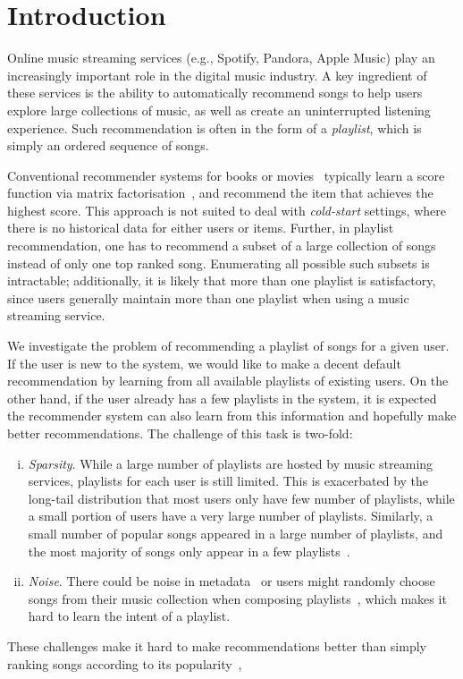 
\section{Introduction}
\label{sec:intro}
Online music streaming services (e.g., Spotify, Pandora, Apple Music) %
play an increasingly important role in the digital music industry.
A key ingredient of these services is the ability to automatically recommend songs to help users explore large collections of music,
as well as create an uninterrupted listening experience.
Such recommendation is often in the form of a \emph{playlist}, which is simply an ordered sequence of songs.

Conventional recommender systems for books or movies~\citep{Sarwar:2001,Netflix}
typically learn a score function via matrix factorisation~\citep{Koren:2009},
and recommend the item that achieves the highest score.
This approach is not suited to deal with \emph{cold-start} settings,
where there is no historical data for either users or items.
%
Further, in playlist recommendation,
one has to recommend a subset of a large collection of songs instead of only one top ranked song.
Enumerating all possible such subsets is intractable;
additionally,
it is likely that more than one playlist is satisfactory, since
users generally maintain more than one playlist when using a music streaming service.

We investigate the problem of recommending a playlist of songs for a given user.
If the user is new to the system, we would like to make a decent default recommendation by learning from 
all available playlists of existing users.
On the other hand, if the user already has a few playlists in the system, it is expected the recommender 
system can also learn from this information and hopefully make better recommendations.
%
The challenge of this task is two-fold:
\begin{enumerate}[(i)]
	\item \emph{Sparsity}. While a large number of playlists are hosted by music streaming services,
playlists for each user is still limited. This is exacerbated by the long-tail distribution that
most users only have few number of playlists, while a small portion of users have a very large number of playlists.
Similarly, a small number of popular songs appeared in a large number of playlists, and the most majority of songs
only appear in a few playlists~\cite{bonnin2013evaluating}.
	\item \emph{Noise}. There could be noise in metadata~\cite{bonnin2015automated} or users might randomly choose songs 
from their music collection when composing playlists~\cite{mcfee2012hypergraph},
which makes it hard to learn the intent of a playlist.
\end{enumerate}
These challenges make it hard to make recommendations better than simply ranking songs according to its 
popularity~\cite{mcfee2012million,bonnin2013evaluating,bonnin2015automated},


